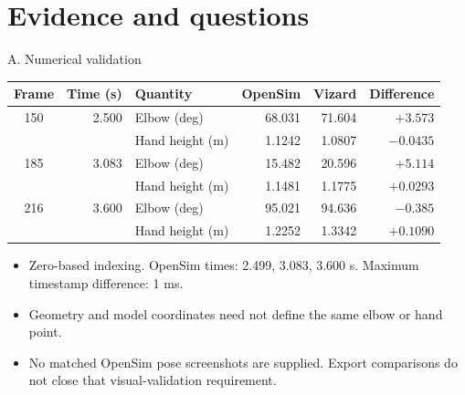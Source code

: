 \section{Evidence and questions}
\begin{frame}{A. Numerical validation}
\centering\footnotesize
\begin{tabular}{@{}crlrrr@{}}\toprule
Frame & Time (s) & Quantity & OpenSim & Vizard & Difference\\\midrule
150 & 2.500 & Elbow (deg) & 68.031 & 71.604 & $+3.573$\\
 & & Hand height (m) & 1.1242 & 1.0807 & $-0.0435$\\
185 & 3.083 & Elbow (deg) & 15.482 & 20.596 & $+5.114$\\
 & & Hand height (m) & 1.1481 & 1.1775 & $+0.0293$\\
216 & 3.600 & Elbow (deg) & 95.021 & 94.636 & $-0.385$\\
 & & Hand height (m) & 1.2252 & 1.3342 & $+0.1090$\\\bottomrule
\end{tabular}\par
\par\medskip\raggedright\small
\begin{itemize}
\item Zero-based indexing. OpenSim times: 2.499, 3.083, 3.600 s. Maximum timestamp difference: 1 ms.
\item Geometry and model coordinates need not define the same elbow or hand point.
\item No matched OpenSim pose screenshots are supplied. Export comparisons do not close that visual-validation requirement.
\end{itemize}
\end{frame}

